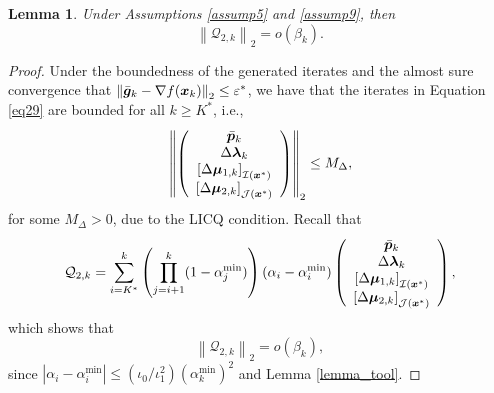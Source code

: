 \documentclass[aos]{imsart}
\numberwithin{equation}{section}
\theoremstyle{plain}
\newtheorem{lemma}{Lemma}
\begin{document}
\begin{appendix}
\begin{lemma}
\label{lemma16}
    Under Assumptions \ref{assump5} and  \ref{assump9}, 
    then 
    \begin{equation*}
        \left\|\mathcal{Q}_{2,k} \right\|_2 = o\left( \beta_k \right).
    \end{equation*}
\end{lemma}

\begin{proof}
    Under the boundedness of the generated iterates and the almost sure convergence that $\left\| \Bar{\bm{g}}_k - \nabla f(\bm{x}_k) \right\|_2 \leq \varepsilon^{*}$, we have that the iterates in Equation \eqref{eq29} are bounded for all $k \geq K^{*}$, i.e., 
    \begin{equation*}
        \left\| \left( \begin{array}{c}
        \Bar{\bm{p}}_k \\
        \Delta \bm{\lambda}_{k}\\
        \left[\Delta \bm{\mu}_{1,k} \right]_{\mathcal{I}(\bm{x}^{*})} \\
        \left[\Delta \bm{\mu}_{2,k} \right]_{\mathcal{J}(\bm{x}^{*})}
    \end{array} \right) \right\|_2 \leq M_{\Delta},
    \end{equation*}
    for some $M_{\Delta} > 0$, due to the LICQ condition. Recall that 
    \begin{equation*}
        \mathcal{Q}_{2,k} = \sum_{i=K^{*}}^{k} \left( \prod_{j=i+1}^{k} (1-\alpha^{\min}_j) \right) (\alpha_i - \alpha^{\min}_i) \left( \begin{array}{c}
        \Bar{\bm{p}}_k \\
        \Delta \bm{\lambda}_{k}\\
        \left[\Delta \bm{\mu}_{1,k} \right]_{\mathcal{I}(\bm{x}^{*})} \\
        \left[\Delta \bm{\mu}_{2,k} \right]_{\mathcal{J}(\bm{x}^{*})}
        \end{array} \right),
    \end{equation*}
    which shows that
    \begin{equation*}
        \left\| \mathcal{Q}_{2,k} \right\|_2 = o\left( \beta_k \right),
    \end{equation*}
    since $|\alpha_i - \alpha^{\min}_i| \leq (\iota_0/\iota_1^2) (\alpha^{\min}_k)^2$ and Lemma \ref{lemma_tool}.
\end{proof}



\end{appendix}
\end{document}
